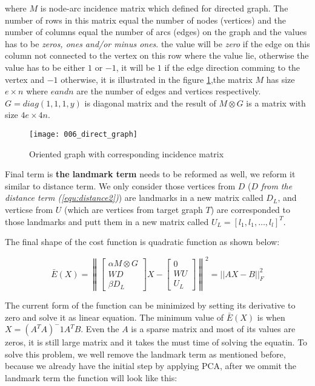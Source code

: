 \documentclass[../structure.tex]{subfiles}
\begin{document}
where $M$ is node-arc incidence matrix which defined for directed graph. The number of rows in this matrix equal the number of nodes (vertices) and the number of columns equal the number of arcs (edges) on the graph and the values has to be \textit{zeros, ones and/or minus ones}. the value will be \textit{zero} if the edge on this column not connected to the vertex on this row where the value lie, otherwise the value has to be either $1$ or $-1$, it will be $1$ if the edge direction comming to the vertex and $-1$ otherwise, it is illustrated in the figure \ref{fig:directed_graph},the matrix $M$ has size $e\times n$ where $e and n$ are the number of edges and vertices respectively. $G = diag(1,1,1,y)$ is diagonal matrix  and the result of $M \otimes G$ is a matrix with size $4e \times 4n$.

\begin{figure}[h!]
\centering
\texttt{[image: 006\_direct\_graph]}
\captionsetup{justification=centering}
\caption{Oriented graph with corresponding incidence matrix  \cite{Wikipedia2010}}
\label{fig:directed_graph}
\end{figure}

Final term is \textbf{the landmark term} needs to be reformed as well, we reform it similar to distance term. We only consider those vertices from $D$ ($D$ \textit{from the distance term (\ref{equ:distance2})}) are landmarks in a new matrix called $D_{L}$, and verticse from $U$ (which are vertices from target graph $T$) are corresponded to those landmarks and putt them in a new matrix called $U_{L} = [l_{1}, l_{1}, \dots,l_{l}]^T$.

The final shape of the cost function is quadratic function as shown below:

\begin{equation}
\bar{E}(X) = \left\|
\begin{bmatrix}
\alpha M \otimes G \\ WD \\ \beta D_{L}
\end{bmatrix}
X -
\begin{bmatrix}
0 \\ WU \\ U_{L}
\end{bmatrix}
\right\| ^2 = ||AX - B||_{F}^2
\end{equation}

The current form of the function can be minimized by setting its derivative to zero and solve it as linear equation. The minimum value of $\bar{E}(X)$ is when $X = (A^T A)^-1 A^T B$. Even the $A$ is a sparse matrix and most of its values are zeros, it is still large matrix and it takes the must time of solving the equatin. To solve this problem, we well remove the landmark term as mentioned before, because we already have the initial step by applying PCA, after we ommit the landmark term the function will look like this:
\end{document}
